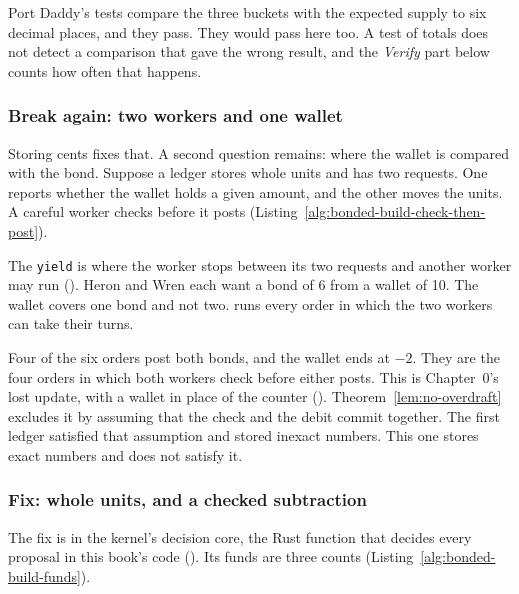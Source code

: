Port Daddy's tests compare the three buckets with the expected supply to
six decimal places, and they pass. They would pass here too. A test of
totals does not detect a comparison that gave the wrong result, and the
\emph{Verify} part below counts how often that happens.

\subsubsection{Break again: two workers and one wallet}

Storing cents fixes that. A second question remains: where the wallet is
compared with the bond. Suppose a ledger stores whole units and has two
requests. One reports whether the wallet holds a given amount, and the
other moves the units. A careful worker checks before it posts
(Listing~\ref{alg:bonded-build-check-then-post}).


The \texttt{yield} is where the worker stops between its two requests and
another worker may run (). Heron and
Wren each want a bond of 6 from a wallet of 10. The wallet covers one bond
and not two. \pdkernelname{} runs every order in which the two workers can
take their turns.


Four of the six orders post both bonds, and the wallet ends at $-2$. They
are the four orders in which both workers check before either posts. This
is Chapter~0's lost update, with a wallet in place of the counter
().
Theorem~\ref{lem:no-overdraft} excludes it by assuming that the check and
the debit commit together. The first ledger satisfied that assumption and
stored inexact numbers. This one stores exact numbers and does not satisfy
it.

\subsubsection{Fix: whole units, and a checked subtraction}

The fix is in the kernel's decision core, the Rust function that decides
every proposal in this book's code
(). Its funds are three counts
(Listing~\ref{alg:bonded-build-funds}).

